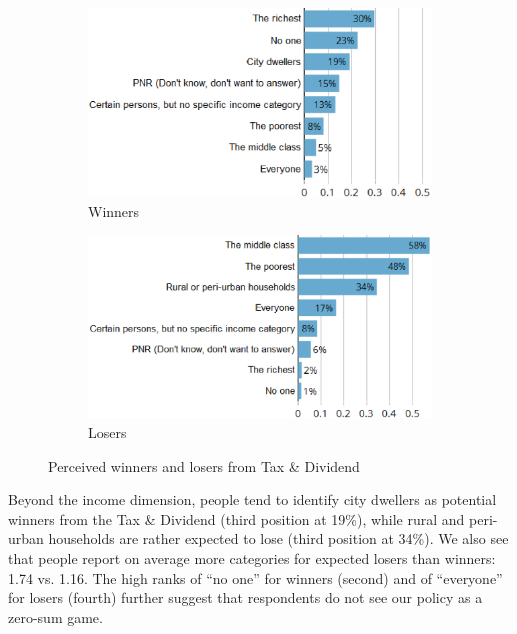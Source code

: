 \documentclass[english,5p,authoryear]{elsarticle}
\begin{document}
\begin{figure}[t]
\centering
\begin{subfigure}[b]{\columnwidth}
   \caption{Winners}
   \includegraphics[width=\columnwidth]{Images_EPS/tax_winners_synchro.eps}
\end{subfigure}

\begin{subfigure}[b]{\columnwidth}
\vspace{0.3cm}
   \caption{Losers}
   \includegraphics[width=\columnwidth]{Images_EPS/tax_losers_synchro.eps}
\end{subfigure}
\caption{Perceived winners and losers from Tax \& Dividend}
\label{fig:winners_losers}
\end{figure}

Beyond the income dimension, people tend to identify city dwellers as potential winners from the Tax \& Dividend (third position at 19\%), while rural and peri-urban households are rather expected to lose (third position at 34\%). We also see that people report on average more categories for expected losers than winners: 1.74 vs. 1.16. The high ranks of ``no one'' for winners (second) and of ``everyone'' for losers (fourth) further suggest that respondents do not see our policy as a zero-sum game. %
\end{document}
